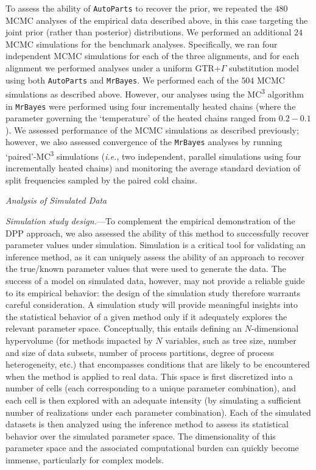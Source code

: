 \documentclass[11pt]{article}
\begin{document}
To assess the ability of \verb!AutoParts! to recover the prior, we repeated the $480$ MCMC analyses of the empirical data described above, in this case targeting the joint prior (rather than posterior) distributions.
We performed an additional $24$ MCMC simulations for the benchmark analyses.
Specifically, we ran four independent MCMC simulations for each of the three alignments, and for each alignment we performed analyses under a uniform GTR+$\Gamma$ substitution model using both \verb!AutoParts! and \verb!MrBayes!.
We performed each of the $504$ MCMC simulations as described above.
However, our analyses using the MC\textsuperscript{3} algorithm in \verb!MrBayes! were performed using four incrementally heated chains (where the parameter governing the `temperature' of the heated chains ranged from ${0.2 - 0.1}$).
We assessed performance of the MCMC simulations as described previously; however, we also assessed convergence of the \verb!MrBayes! analyses by running `paired'-MC\textsuperscript{3} simulations ({\it i.e.}, two independent, parallel simulations using four incrementally heated chains) and monitoring the average standard deviation of split frequencies sampled by the paired cold chains.

\begin{center}
{\it Analysis of Simulated Data}
\end{center}

\noindent
{\it Simulation study design.}---To complement the empirical demonstration of the DPP approach, we also assessed the ability of this method to successfully recover parameter values under simulation.
Simulation is a critical tool for validating an inference method, as it can uniquely assess the ability of an approach to recover the true/known parameter values that were used to generate the data.
The success of a model on simulated data, however, may not provide a reliable guide to its empirical behavior: the design of the simulation study therefore warrants careful consideration.
A simulation study will provide meaningful insights into the statistical behavior of a given method only if it adequately explores the relevant parameter space.
Conceptually, this entails defining an $N$-dimensional hypervolume (for methods impacted by $N$ variables, such as tree size, number and size of data subsets, number of process partitions, degree of process heterogeneity, etc.) that encompasses conditions that are likely to be encountered when the method is applied to real data.
This space is first discretized into a number of cells (each corresponding to a unique parameter combination), and each cell is then explored with an adequate intensity (by simulating a sufficient number of realizations under each parameter combination).
Each of the simulated datasets is then analyzed using the inference method to assess its statistical behavior over the simulated parameter space. 
The dimensionality of this parameter space and the associated computational burden can quickly become immense, particularly for complex models.
	
\end{document}
